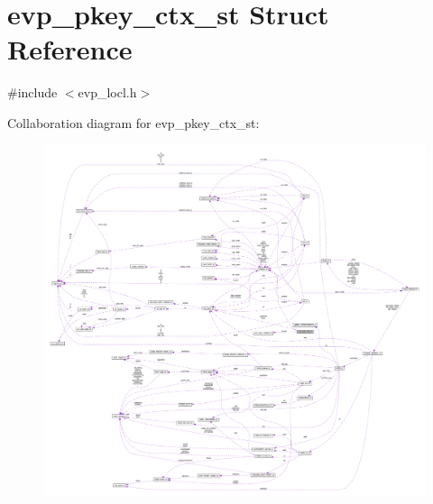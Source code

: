 \hypertarget{structevp__pkey__ctx__st}{}\section{evp\+\_\+pkey\+\_\+ctx\+\_\+st Struct Reference}
\label{structevp__pkey__ctx__st}


{\ttfamily \#include $<$evp\+\_\+locl.\+h$>$}



Collaboration diagram for evp\+\_\+pkey\+\_\+ctx\+\_\+st\+:\nopagebreak
\begin{figure}[H]
\begin{center}
\leavevmode
\includegraphics[width=350pt]{structevp__pkey__ctx__st__coll__graph}
\end{center}
\end{figure}
